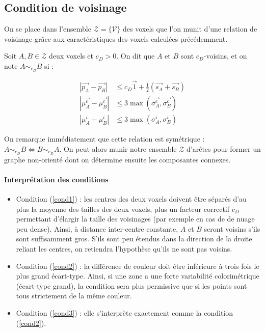 \documentclass[a4paper, onecolumn, 11pt]{article}
\begin{document}
\subsection{Condition de voisinage}
\label{condvoisinage}
On se place dans l'ensemble $\mathcal{Z} = \{\mathcal{V}\}$ des voxels que l'on munit d'une relation de voisinage grâce aux caractéristiques des voxels calculées précédemment.

Soit $A, B \in \mathcal{Z}$ deux voxels et $c_D > 0$. On dit que $A$ et $B$ sont $c_D$-voisins, et on note $A \sim_{c_D} B$ si :

\begin{align}
\left|\overrightarrow{p_A} - \overrightarrow{p_B}\right| &\leq c_D\overrightarrow{1} + \frac{1}{2} \left(\overrightarrow{s_A} + \overrightarrow{s_B}\right)\label{cond1}\\
\left|\overrightarrow{\mu_A^c} - \overrightarrow{\mu_B^c}\right| &\leq 3 \max\left(\overrightarrow{\sigma_A^c}, \overrightarrow{\sigma_B^c}\right)\label{cond2}\\
\left|\mu_A^i - \mu_B^i\right| &\leq 3 \max\left(\sigma_A^i, \sigma_B^i\right)\label{cond3}
\end{align}

On remarque immédiatement que cette relation est symétrique : $A \sim_{c_D} B \Leftrightarrow B \sim_{c_D} A$. On peut alors munir notre ensemble $\mathcal{Z}$ d'arêtes pour former un graphe non-orienté dont on détermine ensuite les composantes connexes.

\paragraph*{Interprétation des conditions}
\begin{itemize}
\item Condition (\ref{cond1}) : les centres des deux voxels doivent être séparés d'au plus la moyenne des tailles des deux voxels, plus un facteur correctif $c_D$ permettant d'élargir la taille des voisinages (par exemple en cas de de nuage peu dense). Ainsi, à distance inter-centre constante, $A$ et $B$ seront voisins s'ils sont suffisamment gros. S'ils sont peu étendus dans la direction de la droite reliant les centres, on retiendra l'hypothèse qu'ils ne sont pas voisins.
\item Condition (\ref{cond2}) : la différence de couleur doit être inférieure à trois fois le plus grand écart-type. Ainsi, si une zone a une forte variabilité colorimétrique (écart-type grand), la condition sera plus permissive que si les points sont tous strictement de la même couleur.
\item Condition (\ref{cond3}) : elle s'interprète exactement comme la condition (\ref{cond2}).
\end{itemize}
\end{document}
